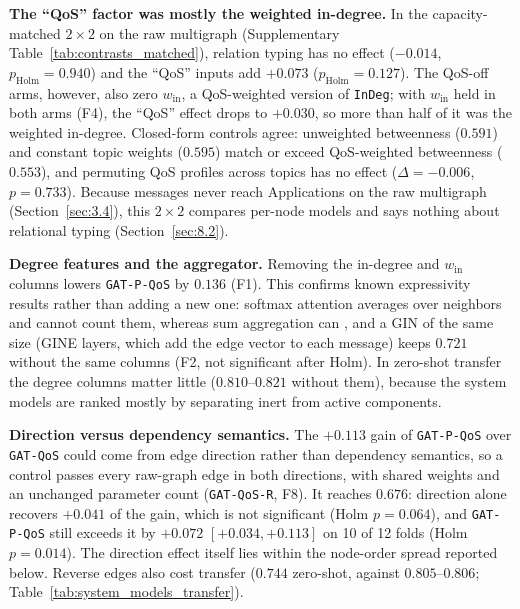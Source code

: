 \documentclass[preprint,3p]{elsarticle}
\begin{document}
\noindent\textbf{The ``QoS'' factor was mostly the weighted in-degree.} In the capacity-matched $2\times2$ on the raw multigraph (Supplementary Table~\ref{tab:contrasts_matched}), relation typing has no effect ($-0.014$, $p_{\text{Holm}} = 0.940$) and the ``QoS'' inputs add $+0.073$ ($p_{\text{Holm}} = 0.127$). The QoS-off arms, however, also zero $w_{\text{in}}$, a QoS-weighted version of \texttt{InDeg}; with $w_{\text{in}}$ held in both arms (F4), the ``QoS'' effect drops to $+0.030$, so more than half of it was the weighted in-degree. Closed-form controls agree: unweighted betweenness ($0.591$) and constant topic weights ($0.595$) match or exceed QoS-weighted betweenness ($0.553$), and permuting QoS profiles across topics has no effect ($\Delta = -0.006$, $p = 0.733$). Because messages never reach Applications on the raw multigraph (Section~\ref{sec:3.4}), this $2\times2$ compares per-node models and says nothing about relational typing (Section~\ref{sec:8.2}).

\noindent\textbf{Degree features and the aggregator.} Removing the in-degree and $w_{\text{in}}$ columns lowers \texttt{GAT-P-QoS} by $0.136$ (F1). This confirms known expressivity results rather than adding a new one: softmax attention averages over neighbors and cannot count them, whereas sum aggregation can \cite{xu2019gin,corso2020pna}, and a GIN of the same size (GINE layers, which add the edge vector to each message) keeps $0.721$ without the same columns (F2, not significant after Holm). In zero-shot transfer the degree columns matter little ($0.810$--$0.821$ without them), because the system models are ranked mostly by separating inert from active components.

\noindent\textbf{Direction versus dependency semantics.} The $+0.113$ gain of \texttt{GAT-P-QoS} over \texttt{GAT-QoS} could come from edge direction rather than dependency semantics, so a control passes every raw-graph edge in both directions, with shared weights and an unchanged parameter count (\texttt{GAT-QoS-R}, F8). It reaches $0.676$: direction alone recovers $+0.041$ of the gain, which is not significant (Holm $p = 0.064$), and \texttt{GAT-P-QoS} still exceeds it by $+0.072$ $[+0.034, +0.113]$ on 10 of 12 folds (Holm $p = 0.014$). The direction effect itself lies within the node-order spread reported below. Reverse edges also cost transfer ($0.744$ zero-shot, against $0.805$--$0.806$; Table~\ref{tab:system_models_transfer}).
\end{document}
